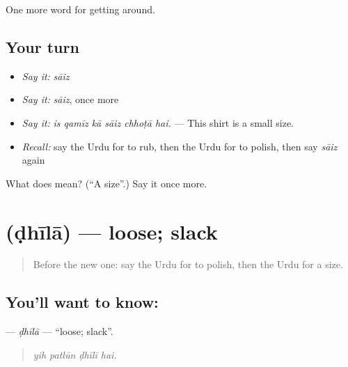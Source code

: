 \begin{grammarlens}[title={What you've built}]
One more word for getting around.
\end{grammarlens}

\subsection*{Your turn}
\begin{itemize}
\raggedright
  \item \emph{Say it:} \emph{sāiz}
  \item \emph{Say it:} \emph{sāiz}, once more
  \item \emph{Say it:} \emph{is qamīz kā sāiz chhoṭā hai.} — This shirt is a small size.
  \item \emph{Recall:} say the Urdu for to rub, then the Urdu for to polish, then say \emph{sāiz} again
\end{itemize}

\begin{tcolorbox}[breakable,colback=teal!4,colframe=teal!35!black,title={Before you move on}]
What does  mean? (\textquotedblleft{}A size\textquotedblright{}.) Say it once more.
\end{tcolorbox}
\section[\texorpdfstring{\ur{ڈھیلا} (ḍhīlā)}{ڈھیلا (ḍhīlā)}]{ (ḍhīlā) — loose; slack}

\label{lesson:UR-C427-dhila}



\begin{quote}
Before the new one: say the Urdu for to polish, then the Urdu for a size.
\end{quote}

\subsection*{You'll want to know: }
\textbf{} — \emph{ḍhīlā} — \textquotedblleft{}loose; slack\textquotedblright{}.

\begin{quote}
   
\end{quote}

\begin{quote}
\emph{yih patlūn ḍhīlī hai.}
\end{quote}


